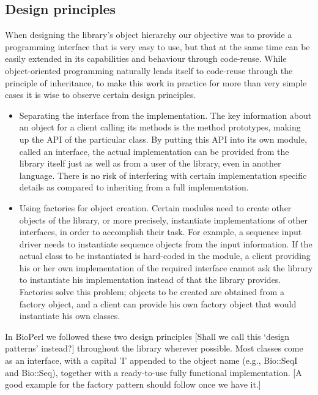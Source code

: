 \documentclass{article}
\begin{document}
\begin{twocolumn}
\subsection{Design principles}

When designing the library's object hierarchy our objective was to
provide a programming interface that is very easy to use, but that at
the same time can be easily extended in its capabilities and behaviour
through code-reuse.  While object-oriented programming naturally lends
itself to code-reuse through the principle of inheritance, to make
this work in practice for more than very simple cases it is wise to
observe certain design principles. 

\begin{itemize}

\item Separating the interface from the implementation.  The key
information about an object for a client calling its methods is the
method prototypes, making up the API of the particular class.  By
putting this API into its own module, called an interface, the actual
implementation can be provided from the library itself just as well as
from a user of the library, even in another language.  There is no risk
of interfering with certain implementation specific details as
compared to inheriting from a full implementation.


\item Using factories for object creation.  Certain modules need to
create other objects of the library, or more precisely, instantiate
implementations of other interfaces, in order to accomplish their
task.  For example, a sequence input driver needs to instantiate
sequence objects from the input information.  If the actual class to be
instantiated is hard-coded in the module, a client providing his or
her own implementation of the required interface cannot ask the
library to instantiate his implementation instead of that the library
provides.  Factories solve this problem; objects to be created are
obtained from a factory object, and a client can provide his own
factory object that would instantiate his own classes.

\end{itemize}

In BioPerl we followed these two design principles [Shall we call this
`design patterns' instead?] throughout the library wherever
possible.  Most classes come as an interface, with a capital 'I'
appended to the object name (e.g., Bio::SeqI and Bio::Seq), together
with a ready-to-use fully functional implementation.  [A good example
for the factory pattern should follow once we have it.]


\end{twocolumn}
\end{document}
